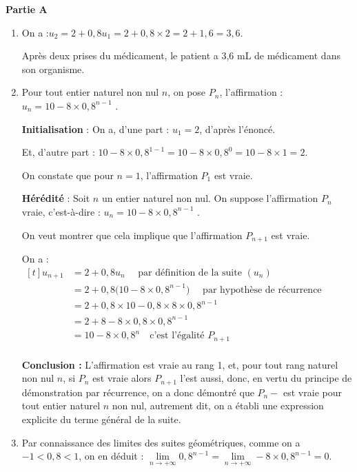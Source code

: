 \medskip

\textbf{Partie A}

\begin{enumerate}
	\item On a :\quad $u_2 = 2 + 0,8u_1 = 2 + 0,8 \times 2 = 2 + 1,6 = 3,6$.

Après deux prises du médicament, le patient a 3,6 mL de médicament dans son organisme.

	\item Pour tout entier naturel non nul $n$, on pose $P_n$, l'affirmation : \og $u_n = 10 - 8\times 0,8^{n-1}$ \fg{}.

\textbf{Initialisation }: On a, d'une part : $u_1 = 2$, d'après l'énoncé.

Et, d'autre part : $10 - 8 \times 0,8^{1 - 1} = 10 - 8 \times 0,8^0 = 10 - 8 \times 1 = 2$.

On constate que pour $n = 1$, l'affirmation $P_1$ est vraie.

\textbf{Hérédité } : Soit $n$ un entier naturel non nul. On suppose l'affirmation $P_n $ vraie, c'est-à-dire : \quad \og $u_n = 10 - 8\times 0,8^{n-1}$ \fg{}.

On veut montrer que cela implique que l'affirmation $ P_{n+1} $ est vraie.

	On a : \quad $ \begin{aligned}[t] u_{n+1}
		&= 2 + 0,8u_n \quad \text{	par définition de la suite }(u_n) \\
		&= 2 + 0,8 \Big(10 - 8\times 0,8^{n-1}\Big) \quad \text{	par hypothèse de récurrence}\\
		&= 2 + 0,8 \times 10 - 0,8 \times 8\times 0,8^{n-1}\\
		&= 2 + 8 - 8\times 0,8 \times 0,8^{n-1}\\
		&= 10 - 8 \times 0,8^{n} \quad \text{c'est l'égalité } P_{n+1}\\
	\end{aligned}$

\textbf{Conclusion :} L'affirmation est vraie au rang 1, et, pour tout rang naturel non nul $n$, \: si $P_n$ est vraie alors $P_{n+1}$ l'est aussi, donc, en vertu du principe de démonstration par récurrence, on a donc démontré que  $P_n-$ est vraie pour tout entier naturel $n$ non nul, autrement dit, on a établi une expression explicite du terme général de la suite.

	\item Par connaissance des limites des suites géométriques, comme on a $-1 < 0,8 < 1$, on en déduit : \quad $\lim\limits_{n \to +\infty} 0,8^{n-1} =  \lim\limits_{n \to +\infty} - 8\times 0,8^{n-1} = 0$.


\end{enumerate}
